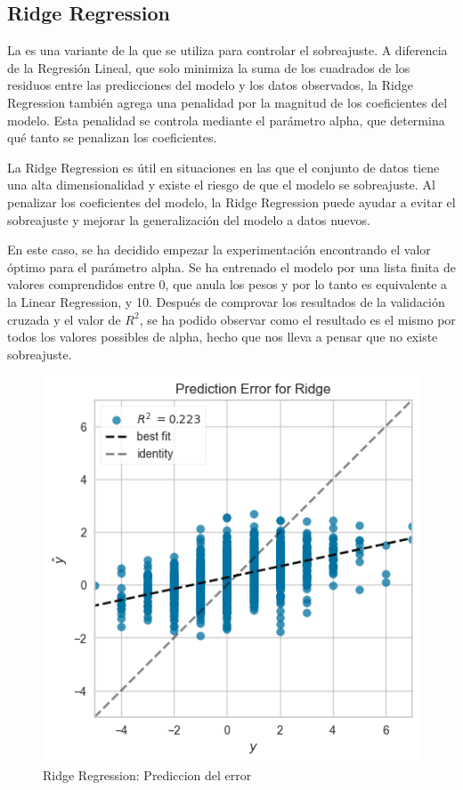 \subsection{Ridge Regression}

La \cite{Sklearn Ridge} es una variante de la \cite{Sklearn Linear Regression} que se utiliza para controlar el sobreajuste. A diferencia de la Regresión Lineal, que solo minimiza la suma de los cuadrados de los residuos entre las predicciones del modelo y los datos observados, la Ridge Regression también agrega una penalidad por la magnitud de los coeficientes del modelo. Esta penalidad se controla mediante el parámetro alpha, que determina qué tanto se penalizan los coeficientes.
\newline

La Ridge Regression es útil en situaciones en las que el conjunto de datos tiene una alta dimensionalidad y existe el riesgo de que el modelo se sobreajuste. Al penalizar los coeficientes del modelo, la Ridge Regression puede ayudar a evitar el sobreajuste y mejorar la generalización del modelo a datos nuevos.
\newline

En este caso, se ha decidido empezar la experimentación encontrando el valor óptimo para el parámetro alpha. Se ha entrenado el modelo por una lista finita de valores comprendidos entre 0, que anula los pesos y por lo tanto es equivalente a la Linear Regression, y 10. Después de comprovar los resultados de la validación cruzada y el valor de $R^2$, se ha podido observar como el resultado es el mismo por todos los valores possibles de alpha, hecho que nos lleva a pensar que no existe sobreajuste. 
\newline

\begin{figure}[H]
    \centering
    \includegraphics[width=\smallSize]{images/linearModelRidge.png}
    \caption{Ridge Regression: Prediccion del error}
    \label{Modelos-Lineales-Ridge-Prediccion-Error}
\end{figure}

